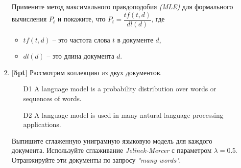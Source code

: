 \begin{enumerate}
	Примените метод максимального правдоподобия \textit{(MLE)} для формального вычисления $P_t$ и 
	покажите, что $P_t = \dfrac{tf(t,d)} {dl(d)}$, где 
	\begin{itemize}
		\item $tf(t, d)$ – это частота слова $t$ в документе $d$, 
		\item $dl(d)$ – это длина документа $d$.
	\end{itemize}
	
	\item \textbf{[5pt]} Рассмотрим коллекцию из двух документов.
	\begin{enumerate}
		\item[D1] A language model is a probability distribution over words or sequences of words.
		\item[D2] A language model is used in many natural language processing applications.
	\end{enumerate}

	Выпишите сглаженную униграмную языковую модель для каждого документа. Используйте сглаживание 
	\textit{Jelinek-Mercer} с параметром $\lambda = 0.5$. Отранжируйте эти документы по запросу 
	\textit{"many words"}.
\end{enumerate}
